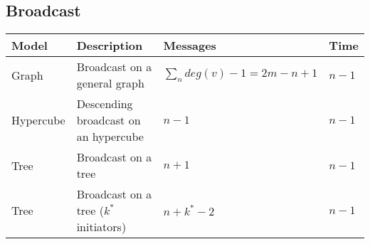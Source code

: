 \subsection{Broadcast}
\begin{table}[h]
\begin{tabular}{llll}
			\textbf{Model}		& \textbf{Description}						& \textbf{Messages}						& \textbf{Time} \\
	\hline 	Graph 				& Broadcast on a general graph				& $\sum_{n}{deg(v) - 1} = 2m - n + 1$	& $n - 1$ \\
	\hline 	Hypercube 			& Descending broadcast on an hypercube		& $n - 1$								& $n - 1$ \\
	\hline 	Tree 				& Broadcast on a tree						& $n + 1$								& $n - 1$ \\
	\hline 	Tree 				& Broadcast on a tree ($k^*$ initiators)	& $n + k^* - 2$							& $n - 1$ \\
\end{tabular}
\end{table}